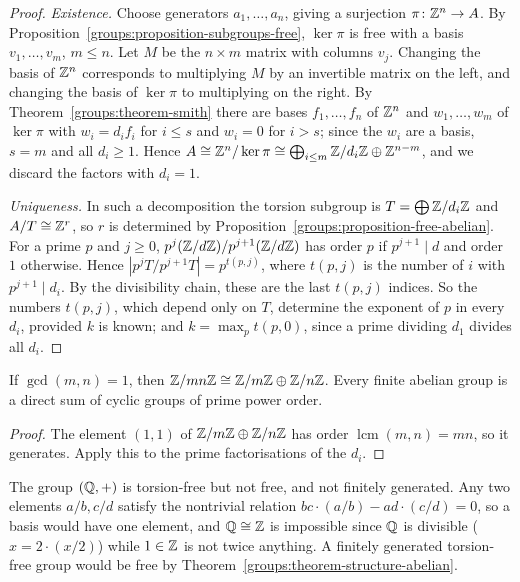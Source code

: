 \begin{proof}
\emph{Existence.} Choose generators $a_1, \ldots, a_n$, giving a surjection
$\pi \colon \mathbb{Z}^n \to A$. By Proposition~\ref{groups:proposition-subgroups-free},
$\ker \pi$ is free with a basis $v_1, \ldots, v_m$, $m \leq n$. Let $M$ be the $n \times m$
matrix with columns $v_j$. Changing the basis of $\mathbb{Z}^n$ corresponds to multiplying $M$
by an invertible matrix on the left, and changing the basis of $\ker \pi$ to multiplying
on the right. By Theorem~\ref{groups:theorem-smith} there are bases
$f_1, \ldots, f_n$ of $\mathbb{Z}^n$ and $w_1, \ldots, w_m$ of $\ker \pi$ with $w_i = d_i f_i$ for
$i \leq s$ and $w_i = 0$ for $i > s$; since the $w_i$ are a basis, $s = m$ and all $d_i \geq 1$.
Hence $A \cong \mathbb{Z}^n / \ker\pi \cong \bigoplus_{i \leq m} \mathbb{Z}/d_i\mathbb{Z} \oplus \mathbb{Z}^{n-m}$, and we
discard the factors with $d_i = 1$.

\emph{Uniqueness.} In such a decomposition the torsion subgroup is
$T = \bigoplus \mathbb{Z}/d_i\mathbb{Z}$ and $A/T \cong \mathbb{Z}^r$, so $r$ is determined by
Proposition~\ref{groups:proposition-free-abelian}. For a prime $p$ and $j \geq 0$,
$p^j(\mathbb{Z}/d\mathbb{Z})/p^{j+1}(\mathbb{Z}/d\mathbb{Z})$ has order $p$ if $p^{j+1} \mid d$ and order $1$
otherwise. Hence $|p^jT/p^{j+1}T| = p^{t(p, j)}$, where $t(p, j)$ is the number of
$i$ with $p^{j+1} \mid d_i$. By the divisibility chain, these are the last $t(p,j)$ indices.
So the numbers $t(p, j)$, which depend only on $T$, determine the exponent of $p$ in
every $d_i$, provided $k$ is known; and $k = \max_p t(p, 0)$, since a prime dividing
$d_1$ divides all $d_i$.
\end{proof}

\begin{corollary}\label{groups:corollary-chinese-remainder}
If $\gcd(m, n) = 1$, then $\mathbb{Z}/mn\mathbb{Z} \cong \mathbb{Z}/m\mathbb{Z} \oplus \mathbb{Z}/n\mathbb{Z}$. Every finite abelian group is
a direct sum of cyclic groups of prime power order.
\end{corollary}

\begin{proof}
The element $(1, 1)$ of $\mathbb{Z}/m\mathbb{Z} \oplus \mathbb{Z}/n\mathbb{Z}$ has order $\operatorname{lcm}(m,n) = mn$, so it
generates. Apply this to the prime factorisations of the $d_i$.
\end{proof}

\begin{counterexample}\label{groups:counterexample-rationals-not-free}
The group $(\mathbb{Q}, +)$ is torsion-free but not free, and not finitely generated. Any two
elements $a/b, c/d$ satisfy the nontrivial relation $bc \cdot (a/b) - ad \cdot (c/d) = 0$,
so a basis would have one element, and $\mathbb{Q} \cong \mathbb{Z}$ is impossible since
$\mathbb{Q}$ is divisible ($x = 2 \cdot (x/2)$) while $1 \in \mathbb{Z}$ is not twice anything. A
finitely generated torsion-free group would be free by
Theorem~\ref{groups:theorem-structure-abelian}.
\end{counterexample}

